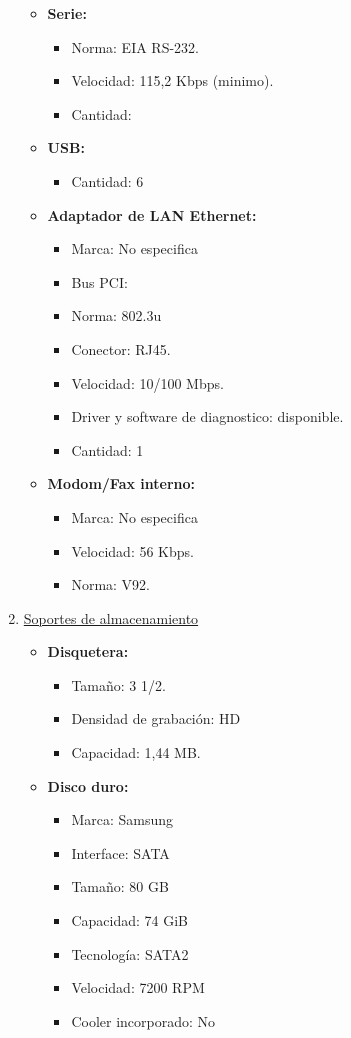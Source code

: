 \begin{enumerate}
\begin{itemize}
    \item \textbf{Serie:}
    \begin{itemize}
      \item Norma: EIA RS-232.
      \item Velocidad: 115,2 Kbps (minimo).
      \item Cantidad:
    \end{itemize}
    
    \item \textbf{USB:}
    \begin{itemize}
      \item Cantidad: 6
    \end{itemize}
    
    \item \textbf{Adaptador de LAN Ethernet:}
    \begin{itemize}
      \item Marca: No especifica
      \item Bus PCI: 
      \item Norma: 802.3u
      \item Conector: RJ45.
      \item Velocidad: 10/100 Mbps.
      \item Driver y software de diagnostico: disponible.
      \item Cantidad: 1
    \end{itemize}
       
    \item \textbf{Modom/Fax interno:}
    \begin{itemize}
      \item Marca: No especifica
      \item Velocidad: 56 Kbps.
      \item Norma: V92.
    \end{itemize}
  \end{itemize}
    
  \item \underline{Soportes de almacenamiento}
  \begin{itemize}
    \item \textbf{Disquetera:}
    \begin{itemize}
      \item Tamaño: 3 1/2.
      \item Densidad de grabación: HD
      \item Capacidad: 1,44 MB.
    \end{itemize}
    
    \item \textbf{Disco duro:}
    \begin{itemize}
      \item Marca: Samsung
      \item Interface: SATA
      \item Tamaño: 80 GB
      \item Capacidad: 74 GiB
      \item Tecnología: SATA2
      \item Velocidad: 7200 RPM
      \item Cooler incorporado: No
    \end{itemize}
    

\end{itemize}
\end{enumerate}
